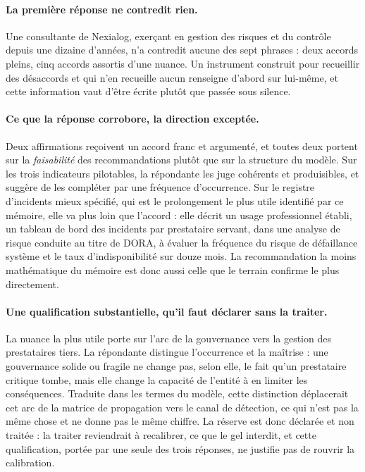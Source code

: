 \paragraph{La première réponse ne contredit rien.} Une consultante de Nexialog, exerçant en
gestion des risques et du contrôle depuis une dizaine d'années, n'a contredit aucune
des sept phrases : deux accords pleins, cinq accords assortis d'une nuance. Un instrument
construit pour recueillir des désaccords et qui n'en recueille aucun renseigne d'abord sur
lui-même, et cette information vaut d'être écrite plutôt que passée sous silence.

\paragraph{Ce que la réponse corrobore, la direction exceptée.} Deux affirmations
reçoivent un accord franc et argumenté, et toutes deux portent sur la \emph{faisabilité} des
recommandations plutôt que sur la structure du modèle. Sur les trois indicateurs pilotables,
la répondante les juge cohérents et produisibles, et suggère de les compléter par une fréquence
d'occurrence. Sur le registre d'incidents mieux spécifié, qui est le prolongement le plus utile
identifié par ce mémoire, elle va plus loin que l'accord : elle décrit un usage professionnel
établi, un tableau de bord des incidents par prestataire servant, dans une analyse de risque
conduite au titre de DORA, à évaluer la fréquence du risque de défaillance système et le taux
d'indisponibilité sur douze mois. La recommandation la moins mathématique du mémoire est donc
aussi celle que le terrain confirme le plus directement.

\paragraph{Une qualification substantielle, qu'il faut déclarer sans la traiter.} La nuance la
plus utile porte sur l'arc de la gouvernance vers la gestion des prestataires tiers. La
répondante distingue l'occurrence et la maîtrise : une gouvernance solide ou
fragile ne change pas, selon elle, le fait qu'un prestataire critique tombe, mais elle change
la capacité de l'entité à en limiter les conséquences. Traduite dans les termes du modèle,
cette distinction déplacerait cet arc de la matrice de propagation vers le canal de détection,
ce qui n'est pas la même chose et ne donne pas le même chiffre. La réserve est donc
déclarée et non traitée : la traiter reviendrait à recalibrer, ce que le gel interdit,
et cette qualification, portée par une seule des trois réponses, ne justifie pas de rouvrir
la calibration.

